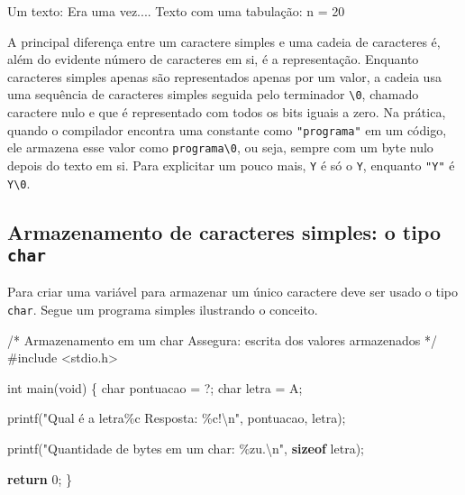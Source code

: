 \documentclass[
  letterpaper,
  DIV=11,
  numbers=noendperiod]{scrartcl}
\newenvironment{Shaded}{\begin{snugshade}}{\end{snugshade}}
\newcommand{\CharTok}[1]{\textcolor[rgb]{0.13,0.47,0.30}{#1}}
\newcommand{\CommentTok}[1]{\textcolor[rgb]{0.37,0.37,0.37}{#1}}
\newcommand{\ControlFlowTok}[1]{\textcolor[rgb]{0.00,0.23,0.31}{\textbf{#1}}}
\newcommand{\DataTypeTok}[1]{\textcolor[rgb]{0.68,0.00,0.00}{#1}}
\newcommand{\DecValTok}[1]{\textcolor[rgb]{0.68,0.00,0.00}{#1}}
\newcommand{\ImportTok}[1]{\textcolor[rgb]{0.00,0.46,0.62}{#1}}
\newcommand{\KeywordTok}[1]{\textcolor[rgb]{0.00,0.23,0.31}{\textbf{#1}}}
\newcommand{\NormalTok}[1]{\textcolor[rgb]{0.00,0.23,0.31}{#1}}
\newcommand{\OperatorTok}[1]{\textcolor[rgb]{0.37,0.37,0.37}{#1}}
\newcommand{\PreprocessorTok}[1]{\textcolor[rgb]{0.68,0.00,0.00}{#1}}
\newcommand{\SpecialCharTok}[1]{\textcolor[rgb]{0.37,0.37,0.37}{#1}}
\newcommand{\StringTok}[1]{\textcolor[rgb]{0.13,0.47,0.30}{#1}}
\begin{document}
\begin{Shaded}
\begin{Highlighting}[]
\NormalTok{Um texto: Era uma vez....}
\NormalTok{Texto com uma tabulação: n =	20}
\end{Highlighting}
\end{Shaded}

A principal diferença entre um caractere simples e uma cadeia de
caracteres é, além do evidente número de caracteres em si, é a
representação. Enquanto caracteres simples apenas são representados
apenas por um valor, a cadeia usa uma sequência de caracteres simples
seguida pelo terminador \texttt{\textbackslash{}0}, chamado caractere
nulo e que é representado com todos os bits iguais a zero. Na prática,
quando o compilador encontra uma constante como \texttt{"programa"} em
um código, ele armazena esse valor como
\texttt{programa\textbackslash{}0}, ou seja, sempre com um byte nulo
depois do texto em si. Para explicitar um pouco mais,
\texttt{\textquotesingle{}Y\textquotesingle{}} é só o \texttt{Y},
enquanto \texttt{"Y"} é \texttt{Y\textbackslash{}0}.

\subsection{\texorpdfstring{Armazenamento de caracteres simples: o tipo
\texttt{char}}{Armazenamento de caracteres simples: o tipo char}}\label{armazenamento-de-caracteres-simples-o-tipo-char}

Para criar uma variável para armazenar um único caractere deve ser usado
o tipo \texttt{char}. Segue um programa simples ilustrando o conceito.

\begin{Shaded}
\begin{Highlighting}[]
\CommentTok{/*}
\CommentTok{Armazenamento em um char}
\CommentTok{Assegura: escrita dos valores armazenados}
\CommentTok{*/}
\PreprocessorTok{\#include }\ImportTok{\textless{}stdio.h\textgreater{}}

\DataTypeTok{int}\NormalTok{ main}\OperatorTok{(}\DataTypeTok{void}\OperatorTok{)} \OperatorTok{\{}
    \DataTypeTok{char}\NormalTok{ pontuacao }\OperatorTok{=} \CharTok{\textquotesingle{}?\textquotesingle{}}\OperatorTok{;}
    \DataTypeTok{char}\NormalTok{ letra }\OperatorTok{=} \CharTok{\textquotesingle{}A\textquotesingle{}}\OperatorTok{;}

\NormalTok{    printf}\OperatorTok{(}\StringTok{"Qual é a letra}\SpecialCharTok{\%c}\StringTok{ Resposta: }\SpecialCharTok{\%c}\StringTok{!}\SpecialCharTok{\textbackslash{}n}\StringTok{"}\OperatorTok{,}\NormalTok{ pontuacao}\OperatorTok{,}\NormalTok{ letra}\OperatorTok{);}

\NormalTok{    printf}\OperatorTok{(}\StringTok{"Quantidade de bytes em um char: }\SpecialCharTok{\%zu}\StringTok{.}\SpecialCharTok{\textbackslash{}n}\StringTok{"}\OperatorTok{,} \KeywordTok{sizeof}\NormalTok{ letra}\OperatorTok{);}

    \ControlFlowTok{return} \DecValTok{0}\OperatorTok{;}
\OperatorTok{\}}
\end{Highlighting}
\end{Shaded}
\end{document}
